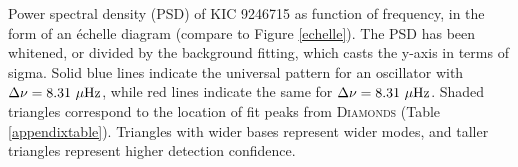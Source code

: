 \label{fig:appendixfig}
Power spectral density (PSD) of KIC 9246715 as function of frequency, in the form of an \'echelle diagram (compare to Figure \ref{echelle}). The PSD has been whitened, or divided by the background fitting, which casts the y-axis in terms of sigma. Solid blue lines indicate the universal pattern for an oscillator with $\Delta \nu = 8.31 \ \mu \rm{Hz}$, while red lines indicate the same for $\Delta \nu = 8.31 \ \mu \rm{Hz}$. Shaded triangles correspond to the location of fit peaks from \textsc{D\large{iamonds}} (Table \ref{appendixtable}). Triangles with wider bases represent wider modes, and taller triangles represent higher detection confidence.